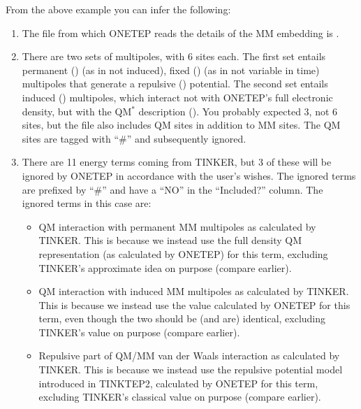 \documentclass[letterpaper,10pt,english]{sphinxmanual}
\begin{document}
From the above example you can infer the following:
\begin{enumerate}
\item {} 
The file from which ONETEP reads the details of the MM embedding is
.

\item {} 
There are two sets of multipoles, with 6 sites each. The first set
entails permanent () (as in not induced), fixed () (as
in not variable in time) multipoles that generate a repulsive
() potential. The second set entails induced ()
multipoles, which interact not with ONETEP’s full electronic
density, but with the QM\(^*\) description (). You
probably expected 3, not 6 sites, but the  file
also includes QM sites in addition to MM sites. The QM sites are
tagged with “\#” and subsequently ignored.

\item {} 
There are 11 energy terms coming from TINKER, but 3 of these will be
ignored by ONETEP in accordance with the user’s wishes. The ignored
terms are prefixed by “\#” and have a “NO” in the “Included?” column.
The ignored terms in this case are:
\begin{itemize}
\item {} 
QM interaction with permanent MM multipoles as calculated by
TINKER. This is because we instead use the full density QM
representation (as calculated by ONETEP) for this term, excluding
TINKER’s approximate idea on purpose (compare
 earlier).

\item {} 
QM interaction with induced MM multipoles as calculated by TINKER.
This is because we instead use the value calculated by ONETEP for
this term, even though the two should be (and are) identical,
excluding TINKER’s value on purpose (compare
 earlier).

\item {} 
Repulsive part of QM/MM van der Waals interaction as calculated by
TINKER. This is because we instead use the repulsive potential
model introduced in TINKTEP2, calculated by ONETEP for this term,
excluding TINKER’s classical value on purpose (compare
 earlier).

\end{itemize}


\end{enumerate}
\end{document}
